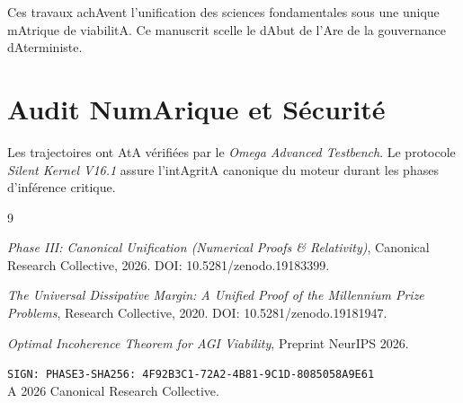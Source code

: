 \documentclass[11pt,a4paper]{amsart}
\begin{document}
Ces travaux achAvent l'unification des sciences fondamentales sous une unique mAtrique de viabilitA. Ce manuscrit scelle le dAbut de l'Are de la gouvernance dAterministe.



\appendix

\section{Audit NumArique et Sécurité}

Les trajectoires ont AtA vérifiées par le \emph{Omega Advanced Testbench}. Le protocole \emph{Silent Kernel V16.1} assure l'intAgritA canonique du moteur durant les phases d'inférence critique.



\begin{thebibliography}{9}

 \emph{Phase III: Canonical Unification (Numerical Proofs \& Relativity)}, Canonical Research Collective, 2026. DOI: 10.5281/zenodo.19183399.

 \emph{The Universal Dissipative Margin: A Unified Proof of the Millennium Prize Problems}, Research Collective, 2020. DOI: 10.5281/zenodo.19181947.

 \emph{Optimal Incoherence Theorem for AGI Viability}, Preprint NeurIPS 2026.

\end{thebibliography}



\bigskip

\noindent\texttt{SIGN: PHASE3-SHA256: 4F92B3C1-72A2-4B81-9C1D-8085058A9E61} \\

A 2026 Canonical Research Collective.
\end{document}
